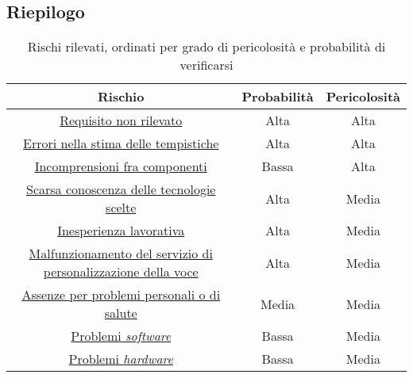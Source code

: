 
\subsection{Riepilogo}
\begin{table}[h]
\centering
\bgroup
\def\arraystretch{1.6}
\begin{tabular}{| c | c | c |}
\hline
\textbf{Rischio} & \textbf{Probabilità} & \textbf{Pericolosità}\\ \hline \hline 
\hyperref[sec:ReqNonRil]{Requisito non rilevato} & Alta & Alta \\ \hline
\hyperref[sec:ErrTemp]{Errori nella stima delle tempistiche} & Alta & Alta \\ \hline
\hyperref[sec:Incomp]{Incomprensioni fra componenti} & Bassa & Alta \\ \hline
\hyperref[sec:ScarsTec]{Scarsa conoscenza delle tecnologie scelte} & Alta & Media \\ \hline
\hyperref[sec:IneLav]{Inesperienza lavorativa} & Alta & Media \\ \hline
\hyperref[sec:PMalf]{Malfunzionamento del servizio di personalizzazione della voce} & Alta & Media \\ \hline
\hyperref[sec:Assenze]{Assenze per problemi personali o di salute} & Media & Media \\ \hline
\hyperref[sec:PSW]{Problemi \textit{software}} & Bassa & Media \\ \hline
\hyperref[sec:PHW]{Problemi \textit{hardware}} & Bassa & Media \\ \hline
\end{tabular}
\egroup
\caption{Rischi rilevati, ordinati per grado di pericolosità e probabilità di verificarsi}
\end{table}

\newpage
